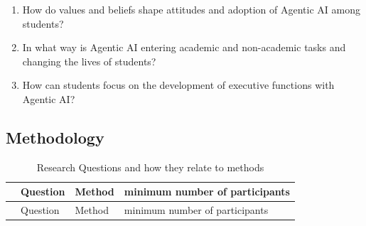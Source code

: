 \documentclass[
  letterpaper,
  DIV=11,
  numbers=noendperiod]{scrartcl}
\providecommand{\tightlist}{%
  \setlength{\itemsep}{0pt}\setlength{\parskip}{0pt}}
\begin{document}
\begin{enumerate}
\def\labelenumi{\arabic{enumi}.}
\tightlist
\item
  How do values and beliefs shape attitudes and adoption of Agentic AI
  among students?
\item
  In what way is Agentic AI entering academic and non-academic tasks and
  changing the lives of students?
\item
  How can students focus on the development of executive functions with
  Agentic AI?
\end{enumerate}

\subsection{Methodology}\label{methodology}

\begin{longtable}[]{@{}
  >{\raggedright\arraybackslash}p{}
  >{\raggedright\arraybackslash}p{}
  >{\raggedright\arraybackslash}p{}
  >{\raggedright\arraybackslash}p{}@{}}
\caption{Research Questions and how they relate to
methods}\tabularnewline
\toprule\noalign{}
\begin{minipage}[b]{\linewidth}\raggedright
\end{minipage} & \begin{minipage}[b]{\linewidth}\raggedright
Question
\end{minipage} & \begin{minipage}[b]{\linewidth}\raggedright
Method
\end{minipage} & \begin{minipage}[b]{\linewidth}\raggedright
minimum number of participants
\end{minipage} \\
\midrule\noalign{}
\endfirsthead
\toprule\noalign{}
\begin{minipage}[b]{\linewidth}\raggedright
\end{minipage} & \begin{minipage}[b]{\linewidth}\raggedright
Question
\end{minipage} & \begin{minipage}[b]{\linewidth}\raggedright
Method
\end{minipage} & \begin{minipage}[b]{\linewidth}\raggedright
minimum number of participants
\end{minipage} \\

\end{longtable}
\end{document}
